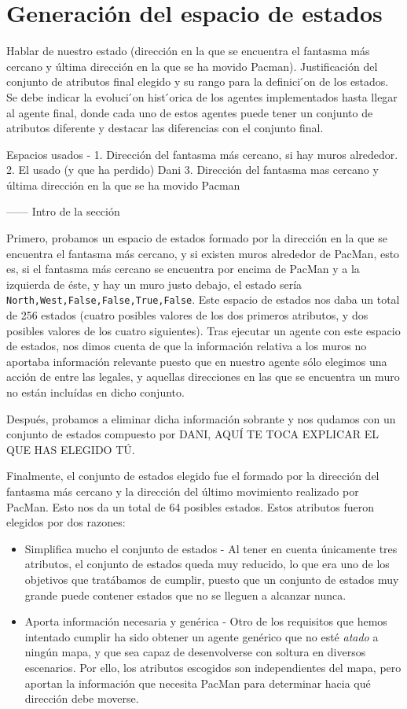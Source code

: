 \documentclass[12pt]{article}
\begin{document}
\section{Generación del espacio de estados}
Hablar de nuestro estado (dirección en la que se encuentra el fantasma más cercano y última dirección en la que se ha movido Pacman).
Justificación del conjunto de atributos final elegido y su rango para la definici ́on de los estados. Se debe indicar la evoluci ́on hist ́orica de los agentes implementados hasta llegar al agente final, donde cada uno de estos agentes puede tener un conjunto de atributos diferente y destacar las diferencias con el conjunto final.

Espacios usados -
1. Dirección del fantasma más cercano, si hay muros alrededor.
2. El usado (y que ha perdido) Dani
3. Dirección del fantasma mas cercano y última dirección en la que se ha movido Pacman

------
Intro de la sección

Primero, probamos un espacio de estados formado por la dirección en la que se encuentra el fantasma más cercano, y si existen muros alrededor de PacMan, esto es, si el fantasma más cercano se encuentra por encima de PacMan y a la izquierda de éste, y hay un muro justo debajo, el estado sería \texttt{North,West,False,False,True,False}. Este espacio de estados nos daba un total de 256 estados (cuatro posibles valores de los dos primeros atributos, y dos posibles valores de los cuatro siguientes).
Tras ejecutar un agente con este espacio de estados, nos dimos cuenta de que la información relativa a los muros no aportaba información relevante puesto que en nuestro agente sólo elegimos una acción de entre las legales, y aquellas direcciones en las que se encuentra un muro no están incluídas en dicho conjunto.

Después, probamos a eliminar dicha información sobrante y nos qudamos con un conjunto de estados compuesto por DANI, AQUÍ TE TOCA EXPLICAR EL QUE HAS ELEGIDO TÚ.

Finalmente, el conjunto de estados elegido fue el formado por la dirección del fantasma más cercano y la dirección del último movimiento realizado por PacMan. Esto nos da un total de 64 posibles estados. Estos atributos fueron elegidos por dos razones:
\begin{itemize}
	\item Simplifica mucho el conjunto de estados - Al tener en cuenta únicamente tres atributos, el conjunto de estados queda muy reducido, lo que era uno de los objetivos que tratábamos de cumplir, puesto que un conjunto de estados muy grande puede contener estados que no se lleguen a alcanzar nunca.
	\item Aporta información necesaria y genérica - Otro de los requisitos que hemos intentado cumplir ha sido obtener un agente genérico que no esté \textit{atado} a ningún mapa, y que sea capaz de desenvolverse con soltura en diversos escenarios. Por ello, los atributos escogidos son independientes del mapa, pero aportan la información que necesita PacMan para determinar hacia qué dirección debe moverse.
\end{itemize}
\end{document}
